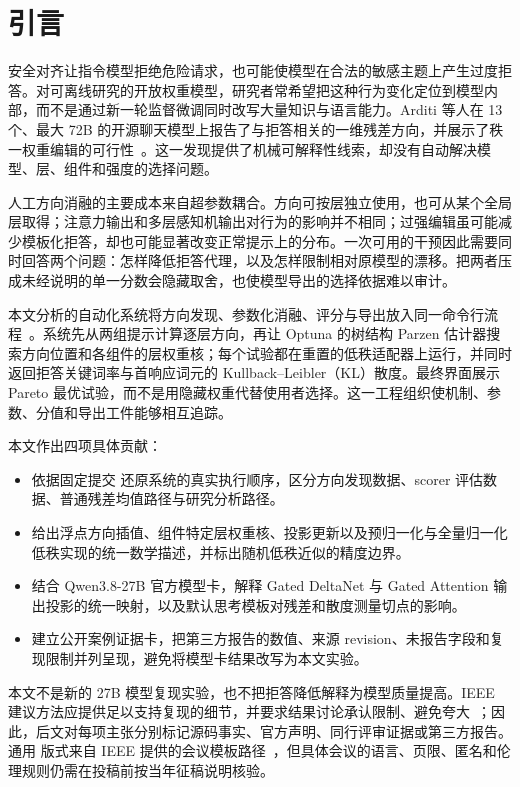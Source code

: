 \section{引言}

安全对齐让指令模型拒绝危险请求，也可能使模型在合法的敏感主题上产生过度拒答。对可离线研究的开放权重模型，研究者常希望把这种行为变化定位到模型内部，而不是通过新一轮监督微调同时改写大量知识与语言能力。Arditi 等人在 13 个、最大 72B 的开源聊天模型上报告了与拒答相关的一维残差方向，并展示了秩一权重编辑的可行性~\cite{arditi2024refusal}。这一发现提供了机械可解释性线索，却没有自动解决模型、层、组件和强度的选择问题。

人工方向消融的主要成本来自超参数耦合。方向可按层独立使用，也可从某个全局层取得；注意力输出和多层感知机输出对行为的影响并不相同；过强编辑虽可能减少模板化拒答，却也可能显著改变正常提示上的分布。一次可用的干预因此需要同时回答两个问题：怎样降低拒答代理，以及怎样限制相对原模型的漂移。把两者压成未经说明的单一分数会隐藏取舍，也使模型导出的选择依据难以审计。

本文分析的自动化系统将方向发现、参数化消融、评分与导出放入同一命令行流程~\cite{automation2026source}。系统先从两组提示计算逐层方向，再让 Optuna 的树结构 Parzen 估计器搜索方向位置和各组件的层权重核；每个试验都在重置的低秩适配器上运行，并同时返回拒答关键词率与首响应词元的 Kullback--Leibler（KL）散度。最终界面展示 Pareto 最优试验，而不是用隐藏权重代替使用者选择。这一工程组织使机制、参数、分值和导出工件能够相互追踪。

本文作出四项具体贡献：

\begin{itemize}
  \item 依据固定提交  还原系统的真实执行顺序，区分方向发现数据、scorer 评估数据、普通残差均值路径与研究分析路径。
  \item 给出浮点方向插值、组件特定层权重核、投影更新以及预归一化与全量归一化低秩实现的统一数学描述，并标出随机低秩近似的精度边界。
  \item 结合 Qwen3.8-27B 官方模型卡，解释 Gated DeltaNet 与 Gated Attention 输出投影的统一映射，以及默认思考模板对残差和散度测量切点的影响。
  \item 建立公开案例证据卡，把第三方报告的数值、来源 revision、未报告字段和复现限制并列呈现，避免将模型卡结果改写为本文实验。
\end{itemize}

本文不是新的 27B 模型复现实验，也不把拒答降低解释为模型质量提高。IEEE 建议方法应提供足以支持复现的细节，并要求结果讨论承认限制、避免夸大~\cite{ieeestructure}；因此，后文对每项主张分别标记源码事实、官方声明、同行评审证据或第三方报告。通用  版式来自 IEEE 提供的会议模板路径~\cite{ieeeauthoring}，但具体会议的语言、页限、匿名和伦理规则仍需在投稿前按当年征稿说明核验。
